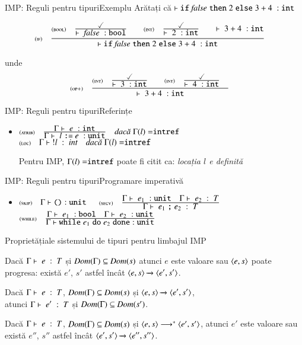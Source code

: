 \documentclass[xcolor=pdftex,romanian,colorlinks]{beamer}
\begin{document}
\begin{frame}{IMP: Reguli pentru tipuri}{Exemplu}
{Arătați că $\tjud[]{\Sif {\Sfalse} \Sthen 2 \Selse 3+4}{\Sint}$}

\[\reg[if]{\tjud[]{\Sif {\Sfalse} \Sthen 2 \Selse 3+4}{\Sint}}{\reg[bool]{\tjud[]{\Sfalse}{\Sbool}}{\done}{} \si \reg[int]{\tjud[]{2}{\Sint}}{\done}{} \si \tjud[]{3+4}{\Sint}}{}{}\]

unde
\[\reg[op+]{\tjud[]{3+4}{\Sint}}{\reg[int]{\tjud[]{3}{\Sint}}{\done}{}\si \reg[int]{\tjud[]{4}{\Sint}}{\done}{}}{}\]
\end{frame}

\begin{frame}{IMP: Reguli pentru tipuri}{Referințe}
\begin{itemize}
\item[] $\reg[atrib]{\tjud{l\terminal{:=}e}{\Sunit}}{\tjud{e}{\Sint}}{\Gamma(l) = \Sintref}$
\vitem[] $\reg[loc]{\tjud{!l}{int}}{}{\Gamma(l) = \Sintref}$

\vitem Pentru IMP, $\Gamma(l) = \Sintref$ poate fi citit ca: {\em locația $l$ e definită}
\end{itemize}
\end{frame}

\begin{frame}{IMP: Reguli pentru tipuri}{Programare imperativă}
\begin{itemize}
\item[] $\reg[skip]{\tjud{\Sskip}{\Sunit}}{}{}$
\vitem[] $\reg[secv]{\tjud{e_1\terminal{;} e_2}{T}}{\tjud{e_1}{\Sunit}\si \tjud{e_2}{T}}{}$
\vitem[] $\reg[while]{\tjud{\Swhile e_1 \Sdo e_2 \Sdone}{\Sunit}}{\tjud{e_1}{\Sbool} \si \tjud{e_2}{\Sunit}}{}$
\end{itemize}
\end{frame}

\begin{frame}{Proprietăți}{ale sistemului de tipuri pentru limbajul IMP}
\begin{theorem} Dacă $\tjud{e}{T}$ și $\Dom(\Gamma) \subseteq \Dom(s)$ atunci $e$ este valoare sau $\c{e,s}$ poate progresa: există $e'$, $s'$ astfel încât $\Ss{\c{e,s}}{\c{e',s'}}$.
\end{theorem}
\vfill

\begin{theorem}
Dacă $\tjud{e}{T}$, $\Dom(\Gamma) \subseteq \Dom(s)$ și $\Ss{\c{e,s}}{\c{e',s'}}$, \\atunci 
$\tjud{e'}{T}$ și $\Dom(\Gamma) \subseteq \Dom(s')$.
\end{theorem}

\vfill
\begin{theorem}
Dacă $\tjud{e}{T}$, $\Dom(\Gamma) \subseteq \Dom(s)$ și ${\c{e,s}}\longrightarrow^\ast{\c{e',s'}}$, atunci $e'$ este valoare sau există $e''$, $s''$ astfel încât $\Ss{\c{e',s'}}{\c{e'',s''}}$.
\end{theorem}

\end{frame}
\end{document}
